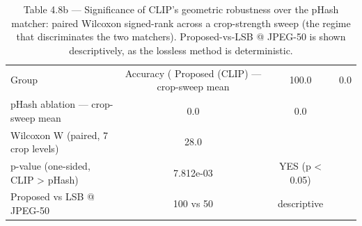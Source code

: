 \begin{table}[htbp]
\centering
\caption{Table 4.8b — Significance of CLIP's geometric robustness over the pHash matcher: paired Wilcoxon signed-rank across a crop-strength sweep (the regime that discriminates the two matchers). Proposed-vs-LSB @ JPEG-50 is shown descriptively, as the lossless method is deterministic.}
\label{tab:table_4_8_significance}
\begin{tabular}{lcc}
\hline
Group & Accuracy (%
\hline
Proposed (CLIP) — crop-sweep mean & 100.0 & 0.0 \\
pHash ablation — crop-sweep mean & 0.0 & 0.0 \\
Wilcoxon W (paired, 7 crop levels) & 28.0 &  \\
p-value (one-sided, CLIP > pHash) & 7.812e-03 & YES (p < 0.05) \\
[ref] Proposed vs LSB @ JPEG-50 & 100 vs 50 & descriptive \\
\hline
\end{tabular}
\end{table}
